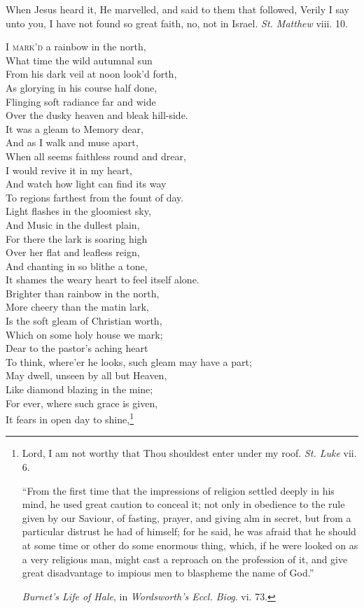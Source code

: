 
When Jesus heard it, He marvelled, and said to them that followed, Verily I say unto you, I have not found so great faith, no, not in Israel. \emph{St. Matthew} viii. 10.

\textsc{I mark’d} a rainbow in the north, \\
 What time the wild autumnal sun \\
 From his dark veil at noon look’d forth, \\
 As glorying in his course half done, \\
 Flinging soft radiance far and wide \\
 Over the dusky heaven and bleak hill-side. \\
  It was a gleam to Memory dear, \\
 And as I walk and muse apart, \\
 When all seems faithless round and drear, \\
 I would revive it in my heart, \\
 And watch how light can find its way \\
 To regions farthest from the fount of day. \\
  Light flashes in the gloomiest sky, \\
 And Music in the dullest plain, \\
 For there the lark is soaring high \\
 Over her flat and leafless reign, \\
 And chanting in so blithe a tone, \\
 It shames the weary heart to feel itself alone. \\
  Brighter than rainbow in the north, \\
 More cheery than the matin lark, \\
 Is the soft gleam of Christian worth, \\
 Which on some holy house we mark; \\
 Dear to the pastor’s aching heart \\
 To think, where’er he looks, such gleam may have a part; \\
  May dwell, unseen by all but Heaven, \\
 Like diamond blazing in the mine; \\
 For ever, where such grace is given, \\
 It fears in open day to shine,\footnote{Lord, I am not worthy that Thou shouldest enter under my roof. \emph{St. Luke} vii. 6. \par “From the first time that the impressions of religion settled deeply in his mind, he used great caution to conceal it; not only in obedience to the rule given by our Saviour, of fasting, prayer, and giving alm in secret, but from a particular distrust he had of himself; for he said, he was afraid that he should at some time or other do some enormous thing, which, if he were looked on as a very religious man, might cast a reproach on the profession of it, and give great disadvantage to impious men to blaspheme the name of God.” \par \emph{Burnet’s Life of Hale}, in \emph{Wordsworth’s Eccl. Biog}. vi. 73.} \\
